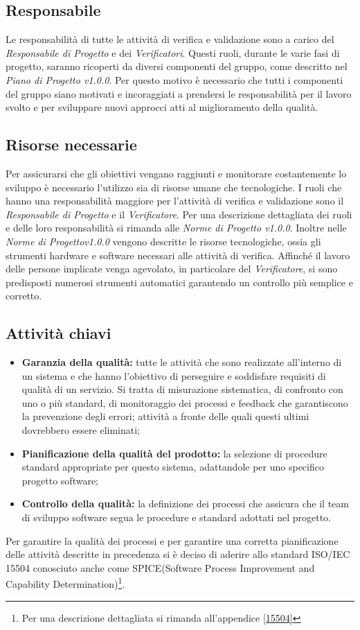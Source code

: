 \subsection{Responsabile}
Le responsabilità di tutte le attività di verifica e validazione sono a carico del \textit{Responsabile di Progetto} e dei \textit{Verificatori}. Questi ruoli, durante le varie fasi di progetto, saranno ricoperti da diversi componenti del gruppo, come descritto nel \textit{Piano di Progetto v1.0.0}. Per questo motivo è necessario che tutti i componenti del gruppo siano motivati e incoraggiati a prendersi le responsabilità per il lavoro svolto e per sviluppare nuovi approcci atti al miglioramento della qualità.

\subsection{Risorse necessarie}
Per assicurarsi che gli obiettivi vengano raggiunti e monitorare costantemente lo sviluppo è necessario l'utilizzo sia di risorse umane che tecnologiche. I ruoli che hanno una responsabilità maggiore per l'attività di verifica e validazione sono il \textit{Responsabile di Progetto} e il \textit{Verificatore}. Per una descrizione dettagliata dei ruoli e delle loro responsabilità si rimanda alle \textit{Norme di Progetto v1.0.0}. Inoltre nelle \textit{Norme di Progettov1.0.0} vengono descritte le risorse tecnologiche, ossia gli strumenti hardware e software necessari alle attività di verifica. Affinché il lavoro delle persone implicate venga agevolato, in particolare del \textit{Verificatore}, si sono predisposti numerosi strumenti automatici garantendo un controllo più semplice e corretto.

\subsection{Attività chiavi}
\begin{itemize}
	\item \textbf{Garanzia della qualità:} tutte le attività che sono realizzate all'interno di un sistema e che hanno l'obiettivo di perseguire e soddisfare requisiti di qualità di un servizio. Si tratta di misurazione sistematica, di confronto con uno o più standard, di monitoraggio dei processi e feedback che garantiscono la prevenzione degli errori; attività a fronte delle quali questi ultimi dovrebbero essere eliminati;
	\item \textbf{Pianificazione della qualità del prodotto:} la selezione di procedure standard appropriate per questo sistema, adattandole per uno specifico progetto software;
	\item \textbf{Controllo della qualità:} la definizione dei processi che assicura che il team  di sviluppo software segua le procedure e standard adottati nel progetto.
\end{itemize}
Per garantire la qualità dei processi e per garantire una corretta pianificazione delle attività descritte in precedenza si è deciso di aderire allo standard ISO/IEC 15504 conosciuto anche come SPICE(Software Process Improvement and Capability Determination)\footnote{Per una descrizione dettagliata si rimanda all'appendice \ref{15504}}.

